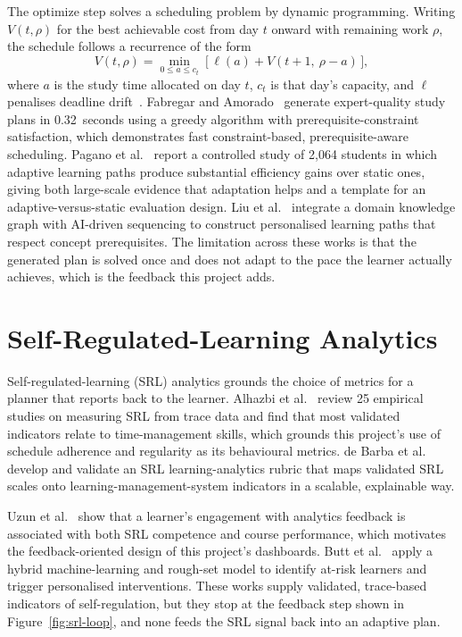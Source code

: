 The optimize step solves a scheduling problem by dynamic programming. Writing $V(t,\rho)$ for the best achievable cost from day $t$ onward with remaining work $\rho$, the schedule follows a recurrence of the form
\begin{equation}
V(t,\rho) = \min_{0 \le a \le c_t}\ \big[\, \ell(a) + V(t+1,\ \rho - a)\,\big],
\label{eq:dp}
\end{equation}
where $a$ is the study time allocated on day $t$, $c_t$ is that day's capacity, and $\ell$ penalises deadline drift~\cite{islam2024}. Fabregar and Amorado~\cite{fabregar2025} generate expert-quality study plans in 0.32~seconds using a greedy algorithm with prerequisite-constraint satisfaction, which demonstrates fast constraint-based, prerequisite-aware scheduling. Pagano et al.~\cite{pagano2026} report a controlled study of 2{,}064 students in which adaptive learning paths produce substantial efficiency gains over static ones, giving both large-scale evidence that adaptation helps and a template for an adaptive-versus-static evaluation design. Liu et al.~\cite{liu2025} integrate a domain knowledge graph with AI-driven sequencing to construct personalised learning paths that respect concept prerequisites. The limitation across these works is that the generated plan is solved once and does not adapt to the pace the learner actually achieves, which is the feedback this project adds.

\section{Self-Regulated-Learning Analytics}
Self-regulated-learning (SRL) analytics grounds the choice of metrics for a planner that reports back to the learner. Alhazbi et al.~\cite{alhazbi2024} review 25 empirical studies on measuring SRL from trace data and find that most validated indicators relate to time-management skills, which grounds this project's use of schedule adherence and regularity as its behavioural metrics. de Barba et al.~\cite{debarba2025} develop and validate an SRL learning-analytics rubric that maps validated SRL scales onto learning-management-system indicators in a scalable, explainable way.

Uzun et al.~\cite{uzun2025} show that a learner's engagement with analytics feedback is associated with both SRL competence and course performance, which motivates the feedback-oriented design of this project's dashboards. Butt et al.~\cite{butt2025} apply a hybrid machine-learning and rough-set model to identify at-risk learners and trigger personalised interventions. These works supply validated, trace-based indicators of self-regulation, but they stop at the feedback step shown in Figure~\ref{fig:srl-loop}, and none feeds the SRL signal back into an adaptive plan.

